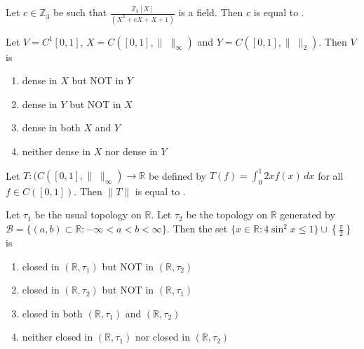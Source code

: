 \iffalse
\chapter{2013}
\section{ma}
\author{EE24BTECH11030}
\fi
\item Let $c \in \mathbb{Z}_3$ be such that $\frac{\mathbb{Z}_3[X]}{(X^3 + cX + X + 1)}$ is a field. Then $c$ is equal to \underline{\hspace{1cm}}.
\bigskip

\item Let $V = C^1[0,1]$, $X = C([0,1], \|\;\|_{\infty})$ and $Y = C([0,1], \|\;\|_2)$. Then $V$ is

\begin{multicols}{2}
    \begin{enumerate}
        \item dense in $X$ but NOT in $Y$
        \item dense in $Y$ but NOT in $X$
        \item dense in both $X$ and $Y$
        \item neither dense in $X$ nor dense in $Y$
    \end{enumerate}
\end{multicols}
\bigskip

\item Let $T : (C([0,1], \|\;\|_{\infty}) \to \mathbb{R}$ be defined by $T(f) = \int_0^1 2xf(x) \, dx$ for all $f \in C([0,1])$. Then $\|T\|$ is equal to \underline{\hspace{1cm}}.
\bigskip

\item Let $\tau_1$ be the usual topology on $\mathbb{R}$. Let $\tau_2$ be the topology on $\mathbb{R}$ generated by $\mathcal{B} = \{(a, b) \subset \mathbb{R} : -\infty < a < b < \infty\}$. Then the set $\{ x \in \mathbb{R} : 4 \sin^2 x \leq 1 \} \cup \left\{ \frac{\pi}{2} \right\}$ is

    \begin{enumerate}
        \item closed in $(\mathbb{R}, \tau_1)$ but NOT in $(\mathbb{R}, \tau_2)$
        \item closed in $(\mathbb{R}, \tau_2)$ but NOT in $(\mathbb{R}, \tau_1)$
        \item closed in both $(\mathbb{R}, \tau_1)$ and $(\mathbb{R}, \tau_2)$
        \item neither closed in $(\mathbb{R}, \tau_1)$ nor closed in $(\mathbb{R}, \tau_2)$
    \end{enumerate}
\bigskip

